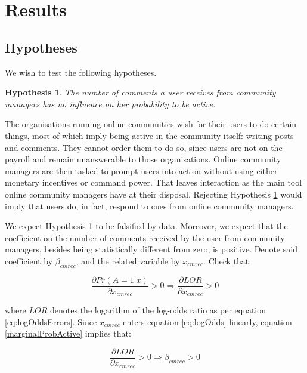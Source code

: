 \section{Results}

\subsection{Hypotheses}

We wish to test the following hypotheses.

\newtheorem{policyWorks}{Hypothesis}

\begin{policyWorks}
	The number of comments a user receives from community managers has no influence on her probability to be active.
	\label{hypothesis:policyWorks}
\end{policyWorks}

The organisations running online communities wish for their users to do certain things, most of which imply being active in the community itself: writing posts and comments. They cannot order them to do so, since users are not on the payroll and remain unanswerable to those organisations. Online community managers are then tasked to prompt users into action without using either monetary incentives or command power. That leaves interaction as the main tool online community managers have at their disposal. Rejecting Hypothesis \ref{hypothesis:policyWorks} would imply that users do, in fact, respond to cues from online community managers.

We expect Hypothesis \ref{hypothesis:policyWorks} to be falsified by data. Moreover, we expect that the coefficient on the number of comments received by the user from community managers, besides being statistically different from zero, is positive. Denote said coefficient by  $\beta_{cmrec}$, and the related variable by $x_{cmrec}$. Check that: 

\begin{equation}
	\frac{\partial Pr(A=1|x)}{\partial x_{cmrec}} > 0 \Rightarrow \frac{\partial LOR}{\partial x_{cmrec}} > 0
	\label{marginalProbActive}
\end{equation}

where $LOR$ denotes the logarithm of the log-odds ratio as per equation \ref{eq:logOddsErrors}. Since $x_{cmrec}$ enters equation \ref{eq:logOdds} linearly, equation \ref{marginalProbActive} implies that:

\begin{equation}
	\frac{\partial LOR}{\partial x_{cmrec}} > 0 \Rightarrow \beta_{cmrec} > 0 
\end {equation}

